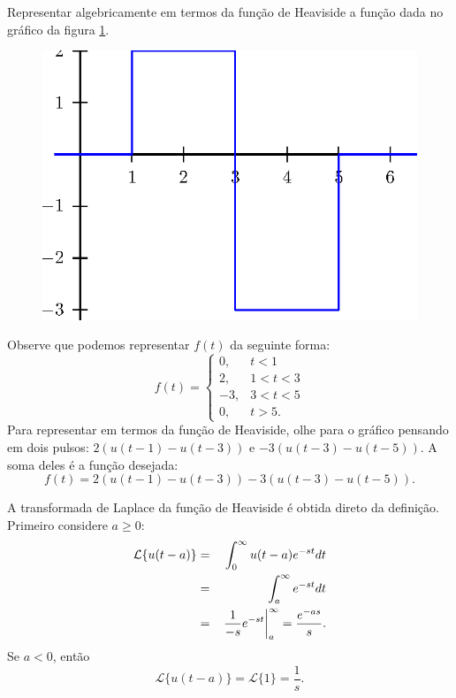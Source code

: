 \begin{ex} Representar algebricamente em termos da função de Heaviside a função dada no gráfico da figura \ref{fig_Heaviside_4}.
\begin{figure}[!ht]
\begin{center}

\includegraphics{cap_trans_int/pics/figura_8}\end{center}
\caption{\label{fig_Heaviside_4}}
\end{figure} 
Observe que podemos representar $f(t)$ da seguinte forma:
\begin{equation}
 f(t)=\left\{ \begin{array}{ll} 0, &t<1\\2,&1<t<3\\-3,& 3<t<5\\0,&t>5. \end{array}\right.
\end{equation}
Para representar em termos da função de Heaviside, olhe para o gráfico pensando em dois pulsos: $2(u(t-1)-u(t-3))$ e $-3(u(t-3)-u(t-5))$. A soma deles é a função desejada:
\begin{equation}
f(t)=2(u(t-1)-u(t-3))-3(u(t-3)-u(t-5)).
\end{equation}
\end{ex}

A transformada de Laplace da função de Heaviside é obtida direto da definição. Primeiro considere $a\geq 0$:
\begin{eqnarray}
\nonumber \mathcal{L}\{u(t-a)\}&=&\int_0^\infty u(t-a) e^{-st}dt\\
\nonumber &=&\int_a^\infty  e^{-st}dt\\
 &=&\left.  \frac{1}{-s}e^{-st}\right|_a^\infty=\frac{e^{-as}}{s}. {\label{Heaviside_trans}}
\end{eqnarray}
Se $a<0$, então
\begin{equation}
 \mathcal{L}\{u(t-a)\}=\mathcal{L}\{1\}=\frac{1}{s}.
\end{equation}

